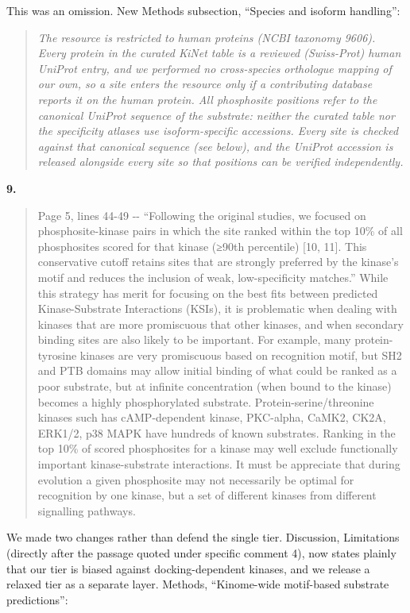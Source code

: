 \documentclass[
]{article}
\begin{document}
This was an omission. New Methods subsection, ``Species and isoform
handling'':

\begin{quote}
\emph{The resource is restricted to human proteins (NCBI taxonomy 9606).
Every protein in the curated KiNet table is a reviewed (Swiss-Prot)
human UniProt entry, and we performed no cross-species orthologue
mapping of our own, so a site enters the resource only if a contributing
database reports it on the human protein. All phosphosite positions
refer to the canonical UniProt sequence of the substrate: neither the
curated table nor the specificity atlases use isoform-specific
accessions. Every site is checked against that canonical sequence (see
below), and the UniProt accession is released alongside every site so
that positions can be verified independently.}
\end{quote}

\textbf{9.}

\begin{quote}
Page 5, lines 44-49 -\/- ``Following the original studies, we focused on
phosphosite-kinase pairs in which the site ranked within the top 10\% of
all phosphosites scored for that kinase (≥90th percentile) {[}10, 11{]}.
This conservative cutoff retains sites that are strongly preferred by
the kinase's motif and reduces the inclusion of weak, low-specificity
matches.'' While this strategy has merit for focusing on the best fits
between predicted Kinase-Substrate Interactions (KSIs), it is
problematic when dealing with kinases that are more promiscuous that
other kinases, and when secondary binding sites are also likely to be
important. For example, many protein-tyrosine kinases are very
promiscuous based on recognition motif, but SH2 and PTB domains may
allow initial binding of what could be ranked as a poor substrate, but
at infinite concentration (when bound to the kinase) becomes a highly
phosphorylated substrate. Protein-serine/threonine kinases such has
cAMP-dependent kinase, PKC-alpha, CaMK2, CK2A, ERK1/2, p38 MAPK have
hundreds of known substrates. Ranking in the top 10\% of scored
phosphosites for a kinase may well exclude functionally important
kinase-substrate interactions. It must be appreciate that during
evolution a given phosphosite may not necessarily be optimal for
recognition by one kinase, but a set of different kinases from different
signalling pathways.
\end{quote}

We made two changes rather than defend the single tier. Discussion,
Limitations (directly after the passage quoted under specific comment
4), now states plainly that our tier is biased against docking-dependent
kinases, and we release a relaxed tier as a separate layer. Methods,
``Kinome-wide motif-based substrate predictions'':
\end{document}
